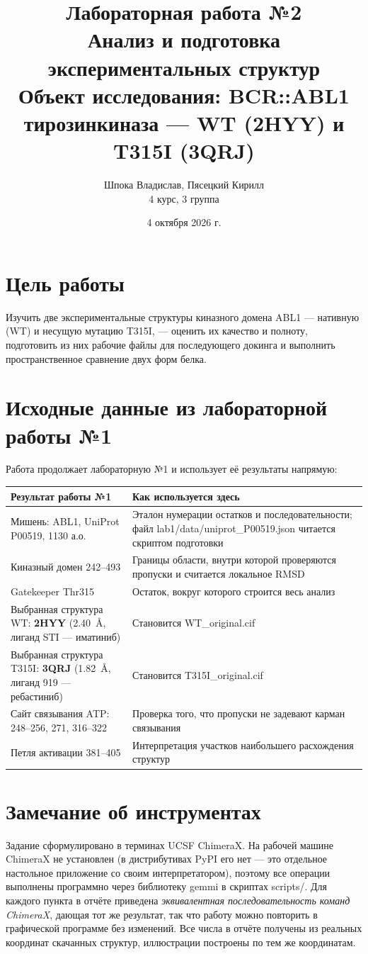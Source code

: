 \documentclass[12pt,a4paper]{article}
\title{\textbf{Лабораторная работа №2}\\[4pt]
Анализ и подготовка экспериментальных структур\\[4pt]
\large Объект исследования: BCR::ABL1 тирозинкиназа --- WT (2HYY) и T315I (3QRJ)}
\author{Шпока Владислав, Пясецкий Кирилл\\4 курс, 3 группа}
\date{4 октября 2026 г.}
\newcommand{\code}[1]{{\ttfamily #1}}
\begin{document}
\maketitle

\section*{Цель работы}
Изучить две экспериментальные структуры киназного домена ABL1 --- нативную (WT) и
несущую мутацию T315I, --- оценить их качество и полноту, подготовить из них рабочие
файлы для последующего докинга и выполнить пространственное сравнение двух форм белка.

\section*{Исходные данные из лабораторной работы №1}

Работа продолжает лабораторную №1 и использует её результаты напрямую:

\begin{center}
\begin{tabular}{L{5.3cm}L{9.2cm}}
\toprule
\textbf{Результат работы №1} & \textbf{Как используется здесь} \\
\midrule
Мишень: ABL1, UniProt \code{P00519}, 1130 а.о. & Эталон нумерации остатков и
последовательности; файл \code{lab1/data/uniprot\_P00519.json} читается скриптом
подготовки \\
Киназный домен 242--493 & Границы области, внутри которой проверяются пропуски и
считается локальное RMSD \\
Gatekeeper Thr315 & Остаток, вокруг которого строится весь анализ \\
Выбранная структура WT: \textbf{2HYY} (2.40~\AA, лиганд STI --- иматиниб) &
Становится \code{WT\_original.cif} \\
Выбранная структура T315I: \textbf{3QRJ} (1.82~\AA, лиганд 919 --- ребастиниб) &
Становится \code{T315I\_original.cif} \\
Сайт связывания ATP: 248--256, 271, 316--322 & Проверка того, что пропуски не
задевают карман связывания \\
Петля активации 381--405 & Интерпретация участков наибольшего расхождения структур \\
\bottomrule
\end{tabular}
\end{center}

\section*{Замечание об инструментах}
Задание сформулировано в терминах UCSF ChimeraX. На рабочей машине ChimeraX не
установлен (в дистрибутивах PyPI его нет --- это отдельное настольное приложение
со своим интерпретатором), поэтому все операции выполнены программно через библиотеку
\code{gemmi} в скриптах \code{scripts/}. Для каждого пункта в отчёте приведена
\emph{эквивалентная последовательность команд ChimeraX}, дающая тот же результат, так
что работу можно повторить в графической программе без изменений. Все числа в отчёте
получены из реальных координат скачанных структур, иллюстрации построены по тем же
координатам.
\end{document}

